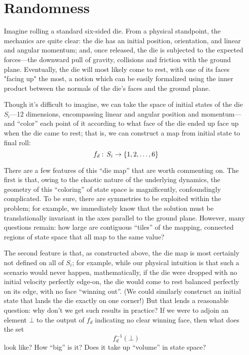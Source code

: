

\chapter{Randomness}

Imagine rolling a standard six-sided die. From a physical standpoint, the mechanics are quite clear: the die has an initial position, orientation, and linear and angular momentum; and, once released, the die is subjected to the expected forces---the downward pull of gravity, collisions and friction with the ground plane. Eventually, the die will most likely come to rest, with one of its faces "facing up" the most, a notion which can be easily formalized using the inner product between the normals of the die's faces and the ground plane.

Though it's difficult to imagine, we can take the space of initial states of the die $S_i$---12 dimensions, encompassing linear and angular position and momentum---and ``color'' each point of it according to what face of the die ended up face up when the die came to rest; that is, we can construct a map from initial state to final roll:
\[ f_d: \, S_i \to \left\{1,2,\ldots,6\right\} \]

There are a few features of this ``die map'' that are worth commenting on. The first is that, owing to the chaotic nature of the underlying dynamics, the geometry of this ``coloring'' of state space is magnificently, confoundingly complicated. To be sure, there are symmetries to be exploited within the problem; for example, we immediately know that the solution must be translationally invariant in the axes parallel to the ground plane. However, many questions remain: how large are contiguous ``tiles'' of the mapping, connected regions of state space that all map to the same value?

The second feature is that, as constructed above, the die map is most certainly not defined on all of $S_i$; for example, while our physical intuition is that such a scenario would never happen, mathematically, if the die were dropped with no initial velocity perfectly edge-on, the die would come to rest balanced perfectly on its edge, with no face ``winning out''. (We could similarly construct an initial state that lands the die exactly on one corner!) But that lends a reasonable question: why don't we get such results in practice? If we were to adjoin an element $\bot$ to the output of $f_d$ indicating no clear winning face, then what does the set
\[ f_d^{-1}(\bot) \]
look like? How ``big'' is it? Does it take up ``volume'' in state space?

